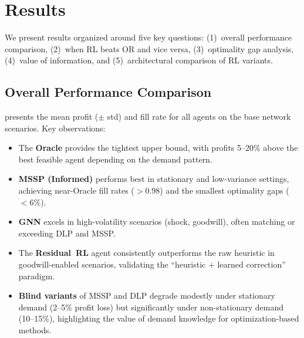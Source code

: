 
\section{Results}\label{sec:results}

We present results organized around five key questions: (1)~overall
performance comparison, (2)~when RL beats OR and vice versa,
(3)~optimality gap analysis, (4)~value of information, and
(5)~architectural comparison of RL variants.

\subsection{Overall Performance Comparison}

 presents the mean profit ($\pm$ std) and fill
rate for all agents on the base network scenarios. Key observations:

\begin{itemize}
  \item The \textbf{Oracle} provides the tightest upper bound, with
        profits 5--20\% above the best feasible agent depending on the
        demand pattern.
  \item \textbf{MSSP (Informed)} performs best in stationary and
        low-variance settings, achieving near-Oracle fill rates
        ($>0.98$) and the smallest optimality gaps ($<6\%$).
  \item \textbf{GNN} excels in high-volatility scenarios
        (shock, goodwill), often matching or exceeding DLP and MSSP.
  \item The \textbf{Residual~RL} agent consistently outperforms the
        raw heuristic in goodwill-enabled scenarios, validating the
        ``heuristic + learned correction'' paradigm.
  \item \textbf{Blind variants} of MSSP and DLP degrade modestly
        under stationary demand (2--5\% profit loss) but significantly
        under non-stationary demand (10--15\%), highlighting the value
        of demand knowledge for optimization-based methods.
\end{itemize}

